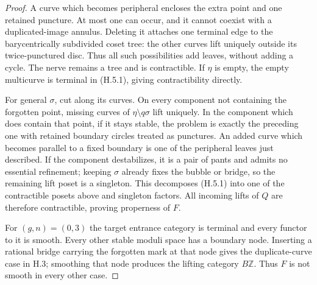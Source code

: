\begin{proof}
A curve which becomes peripheral encloses the extra point and
one retained puncture. At most one can occur, and it cannot
coexist with a duplicated-image annulus. Deleting it attaches
one terminal edge to the barycentrically subdivided coset tree:
the other curves lift uniquely outside its twice-punctured disc.
Thus all such possibilities add leaves, without adding a cycle.
The nerve remains a tree and is contractible. If $\eta$ is
empty, the empty multicurve is terminal in (H.5.1), giving
contractibility directly.

For general $\sigma$, cut along its curves. On every component
not containing the forgotten point, missing curves of
$\eta\setminus q\sigma$ lift uniquely. In the component which
does contain that point, if it stays stable, the problem is
exactly the preceding one with retained boundary circles treated
as punctures. An added curve which becomes parallel to a fixed
boundary is one of the peripheral leaves just described. If the
component destabilizes, it is a pair of pants and admits no
essential refinement; keeping $\sigma$ already fixes the bubble
or bridge, so the remaining lift poset is a singleton. This
decomposes (H.5.1) into one of the contractible posets above and
singleton factors. All incoming lifts of $Q$ are therefore
contractible, proving properness of $F$.

For $(g,n)=(0,3)$ the target entrance category is terminal and
every functor to it is smooth. Every other stable moduli space
has a boundary node. Inserting a rational bridge carrying the
forgotten mark at that node gives the duplicate-curve case in
H.3; smoothing that node produces the lifting category
$B\mathbb Z$. Thus $F$ is not smooth in every other case.
\end{proof}

